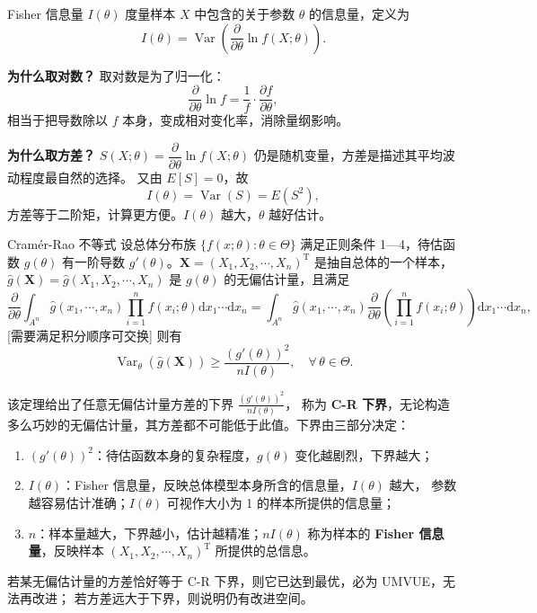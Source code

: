 \begin{note}
Fisher 信息量 $I(\theta)$ 度量样本 $X$ 中包含的关于参数 $\theta$ 的信息量，定义为
\[
I(\theta) = \operatorname{Var}\left(\frac{\partial}{\partial\theta}\ln f(X;\theta)\right).
\]

\textbf{为什么取对数？}
取对数是为了归一化：
\[
\frac{\partial}{\partial\theta}\ln f = \frac{1}{f}\cdot\frac{\partial f}{\partial\theta},
\]
相当于把导数除以 $f$ 本身，变成相对变化率，消除量纲影响。

\textbf{为什么取方差？}
$S(X;\theta) = \dfrac{\partial}{\partial\theta}\ln f(X;\theta)$ 仍是随机变量，方差是描述其平均波动程度最自然的选择。
又由 $E[S]=0$，故
\[
I(\theta) = \operatorname{Var}(S) = E(S^2),
\]
方差等于二阶矩，计算更方便。$I(\theta)$ 越大，$\theta$ 越好估计。
\end{note}
\begin{theorem}{Cramér-Rao 不等式}
设总体分布族 $\{f(x;\theta): \theta \in \Theta\}$ 满足正则条件 1—4，待估函数 $g(\theta)$ 有一阶导数
$g'(\theta)$。$\boldsymbol{X} = (X_1, X_2, \cdots, X_n)^{\mathrm{T}}$ 是抽自总体的一个样本，
$\hat{g}(\boldsymbol{X}) = \hat{g}(X_1, X_2, \cdots, X_n)$ 是 $g(\theta)$ 的无偏估计量，且满足
\[
\frac{\partial}{\partial \theta} \int_{A^n} \hat{g}(x_1, \cdots, x_n) \prod_{i=1}^n f(x_i; \theta)
\mathrm{d}x_1 \cdots \mathrm{d}x_n
= \int_{A^n} \hat{g}(x_1, \cdots, x_n) \frac{\partial}{\partial \theta}
\left(\prod_{i=1}^n f(x_i; \theta)\right) \mathrm{d}x_1 \cdots \mathrm{d}x_n,
\]
[需要满足积分顺序可交换]
则有
\begin{equation}
\operatorname{Var}_{\theta}(\hat{g}(\boldsymbol{X})) \geq \frac{(g'(\theta))^2}{nI(\theta)}, \quad \forall\, \theta \in \Theta.
\end{equation}
\end{theorem}
\begin{note}
该定理给出了任意无偏估计量方差的下界 $\frac{(g'(\theta))^2}{nI(\theta)}$，
称为 \textbf{C-R 下界}，无论构造多么巧妙的无偏估计量，其方差都不可能低于此值。下界由三部分决定：
\begin{enumerate}
    \item $(g'(\theta))^2$：待估函数本身的复杂程度，$g(\theta)$ 变化越剧烈，下界越大；
    \item $I(\theta)$：Fisher 信息量，反映总体模型本身所含的信息量，$I(\theta)$ 越大，
    参数越容易估计准确；$I(\theta)$ 可视作大小为 1 的样本所提供的信息量；
    \item $n$：样本量越大，下界越小，估计越精准；$nI(\theta)$ 称为样本的
    \textbf{Fisher 信息量}，反映样本 $(X_1, X_2, \cdots, X_n)^{\mathrm{T}}$ 所提供的总信息。
\end{enumerate}
若某无偏估计量的方差恰好等于 C-R 下界，则它已达到最优，必为 UMVUE，无法再改进；
若方差远大于下界，则说明仍有改进空间。
\end{note}

